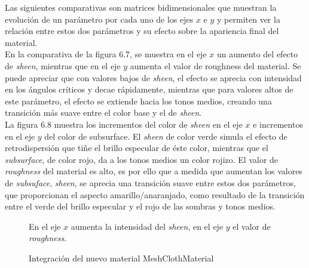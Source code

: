 Las siguientes comparativas son matrices bidimensionales que muestran la evoluci\'on de un par\'ametro por cada uno de los ejes
$x$ e $y$ y permiten ver la relaci\'on entre estos dos par\'ametros y su efecto sobre la apariencia final del material.\\

En la comparativa de la figura 6.7, se muestra en el eje $x$ un aumento del efecto de \textit{sheen}, mientras que en el
eje $y$ aumenta el valor de roughness del material. Se puede apreciar que con valores bajos de \textit{sheen}, el efecto
se aprecia con intensidad en los \'angulos cr\'iticos y decae r\'apidamente, mientras que para valores altos de este par\'ametro,
el efecto se extiende hacia los tonos medios, creando una transici\'on m\'as suave entre el color base y el de \textit{sheen}.\\

La figura 6.8 muestra los incrementos del color de \textit{sheen} en el eje $x$ e incrementos en el eje $y$ del color de subsurface.
El \textit{sheen} de color verde simula el efecto de retrodispersi\'on que ti\~ne el brillo especular de \'este color, mientras
que el \textit{subsurface}, de color rojo, da a los tonos medios un color rojizo. El valor de \textit{roughness} del material
es alto, es por ello que a medida que aumentan los valores de \textit{subsuface}, \textit{sheen}, se aprecia una transici\'on
suave entre estos dos par\'ametros, que proporcionan el aspecto amarillo/anaranjado, como resultado de la transici\'on entre
el verde del brillo especular y el rojo de las sombras y tonos medios.

\begin{figure}[H]
  \vspace{0.5cm}
  \centering
    \caption{En el eje $x$ aumenta la intensidad del \textit{sheen}, en el eje $y$ el valor de \textit{roughness}.}
  \vspace{0.5cm}
\end{figure}
\singlespacing

\begin{figure}[H]
  \vspace{0.5cm}
  \centering
  \caption{Integraci\'on del nuevo material MeshClothMaterial}
  \vspace{0.5cm}
\end{figure}
\singlespacing